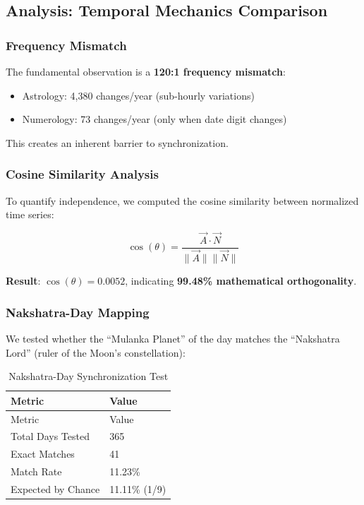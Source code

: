 \documentclass[
  11pt,
  a4paper,
  oneside,
  openany]{article}
\providecommand{\tightlist}{%
  \setlength{\itemsep}{0pt}\setlength{\parskip}{0pt}}\usepackage{longtable,booktabs,array}
\begin{document}
\subsection{Analysis: Temporal Mechanics
Comparison}\label{analysis-temporal-mechanics-comparison}

\subsubsection{Frequency Mismatch}\label{frequency-mismatch}

The fundamental observation is a \textbf{120:1 frequency mismatch}:

\begin{itemize}
\tightlist
\item
  Astrology: 4,380 changes/year (sub-hourly variations)
\item
  Numerology: 73 changes/year (only when date digit changes)
\end{itemize}

This creates an inherent barrier to synchronization.

\subsubsection{Cosine Similarity
Analysis}\label{cosine-similarity-analysis}

To quantify independence, we computed the cosine similarity between
normalized time series:

\[
\cos(\theta) = \frac{\vec{A} \cdot \vec{N}}{\|\vec{A}\| \|\vec{N}\|}
\]

\textbf{Result}: \(\cos(\theta) = 0.0052\), indicating \textbf{99.48\%
mathematical orthogonality}.

\subsubsection{Nakshatra-Day Mapping}\label{nakshatra-day-mapping}

We tested whether the ``Mulanka Planet'' of the day matches the
``Nakshatra Lord'' (ruler of the Moon's constellation):

\begin{longtable}[]{@{}ll@{}}
\caption{Nakshatra-Day Synchronization
Test}\label{tbl-nakshatra}\tabularnewline
\toprule\noalign{}
Metric & Value \\
\midrule\noalign{}
\endfirsthead
\toprule\noalign{}
Metric & Value \\
\midrule\noalign{}
\endhead
\bottomrule\noalign{}
\endlastfoot
Total Days Tested & 365 \\
Exact Matches & 41 \\
Match Rate & 11.23\% \\
Expected by Chance & 11.11\% (1/9) \\
\end{longtable}
\end{document}
